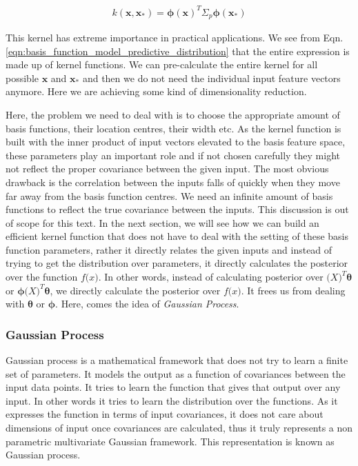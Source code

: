 \documentclass[english]{tktltiki}
\begin{document}
\begin{equation}
\label{eqn:basis_function_model_kernel}
\begin{split}
	k(\mathbf{x}, \mathbf{x_*}) = \boldsymbol\phi(\mathbf{x})^T \Sigma_p \boldsymbol\phi(\mathbf{x_*})
\end{split}
\end{equation}

This kernel has extreme importance in practical applications. We see from Eqn. \ref{eqn:basis_function_model_predictive_distribution} that the entire expression is made up of kernel functions. We can pre-calculate the entire kernel for all possible $\mathbf{x}$ and $\mathbf{x_*}$ and then we do not need the individual input feature vectors anymore. Here we are achieving some kind of dimensionality reduction.

Here, the problem we need to deal with is to choose the appropriate amount of basis functions, their location centres, their width etc. As the kernel function is built with the inner product of input vectors elevated to the basis feature space, these parameters play an important role and if not chosen carefully they might not reflect the proper covariance between the given input. The most obvious drawback is the correlation between the inputs falls of quickly when they move far away from the basis function centres. We need an infinite amount of basis functions to reflect the true covariance between the inputs. This discussion is out of scope for this text. In the next section, we will see how we can build an efficient kernel function that does not have to deal with the setting of these basis function parameters, rather it directly relates the given inputs and instead of trying to get the distribution over parameters, it directly calculates the posterior over the function $f\mathbf(x)$. In other words, instead of calculating posterior over $\mathbf(X)^T \boldsymbol\theta$ or $\boldsymbol\phi \mathbf(X)^T \boldsymbol\theta$, we directly calculate the posterior over $f\mathbf(x)$. It frees us from dealing with $\boldsymbol \theta$ or $\boldsymbol \phi$. Here, comes the idea of \textit{Gaussian Process}.

\subsubsection{Gaussian Process}

Gaussian process \cite{gaussian_process_for_machine_learning} is a mathematical framework that does not try to learn a finite set of parameters. It models the output as a function of covariances between the input data points. It tries to learn the function that gives that output over any input. In other words it tries to learn the distribution over the functions. As it expresses the function in terms of input covariances, it does not care about dimensions of input once covariances are calculated, thus it truly represents a non parametric multivariate Gaussian framework. This representation is known as Gaussian process.
\end{document}
